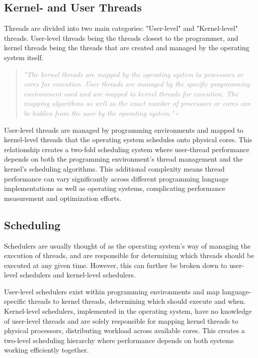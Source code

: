 \documentclass[12pt,a4paper]{article}
\begin{document}
\subsection{Kernel- and User Threads}

Threads are divided into two main categories: "User-level" and "Kernel-level" threads\parencite[p. 27]{Rauber2023}. User-level threads being the threads closest to the programmer, and kernel threads being the threads that are created and managed by the operating system itself.

\begin{quote}
    \textit{\textcolor{darkgray}{"The kernel threads are mapped by the operating system to processors or cores for execution. User threads are managed by the specific programming environment used and are mapped to kernel threads for execution. The mapping algorithms as well as the exact number of processors or cores can be hidden from the user by the operating system."}} - \parencite[p. 27]{Rauber2023}
\end{quote}

User-level threads are managed by programming environments and mapped to kernel-level threads that the operating system schedules onto physical cores. This relationship creates a two-fold scheduling system where user-thread performance depends on both the programming environment's thread management and the kernel's scheduling algorithms. This additional complexity means thread performance can vary significantly across different programming language implementations as well as operating systems, complicating performance measurement and optimization efforts.

\subsection{Scheduling}

Schedulers are usually thought of as the operating system's way of managing the execution of threads, and are responsible for determining which threads should be executed at any given time. However, this can further be broken down to user-level schedulers and kernel-level schedulers\parencite[pp. 154-155]{Rauber2023}.

User-level schedulers exist within programming environments and map language-specific threads to kernel threads, determining which should execute and when. Kernel-level schedulers, implemented in the operating system, have no knowledge of user-level threads and are solely responsible for mapping kernel threads to physical processors, distributing workload across available cores\parencite[pp. 155-156]{Rauber2023}. This creates a two-level scheduling hierarchy where performance depends on both systems working efficiently together.
\end{document}
